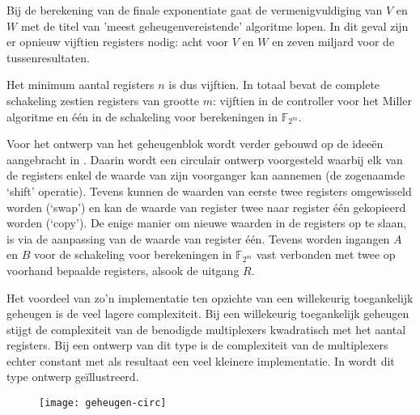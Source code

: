 Bij de berekening van de finale exponentiate gaat de vermenigvuldiging van $V$ en $W$ met de titel van 'meest geheugenvereistende' algoritme lopen. In dit geval zijn er opnieuw vijftien registers nodig: acht voor $V$ en $W$ en zeven miljard voor de tussenresultaten.

Het minimum aantal registers $n$ is dus vijftien. In totaal bevat de complete schakeling zestien registers van grootte $m$: vijftien in de controller voor het Miller algoritme en \'e\'en in de schakeling voor berekeningen in $\mathbb{F}_{2^m}$.

Voor het ontwerp van het geheugenblok wordt verder gebouwd op de idee\"en aangebracht in \cite{lee}. Daarin wordt een circulair ontwerp voorgesteld waarbij elk van de registers enkel de waarde van zijn voorganger kan aannemen (de zogenaamde `shift' operatie). Tevens kunnen de waarden van eerste twee registers omgewisseld worden (`swap') en kan de waarde van register twee naar register \'e\'en gekopieerd worden (`copy'). De enige manier om nieuwe waarden in de registers op te slaan, is via de aanpassing van de waarde van register \'e\'en. Tevens worden ingangen $A$ en $B$ voor de schakeling voor berekeningen in $\mathbb{F}_{2^m}$ vast verbonden met twee op voorhand bepaalde registers, alsook de uitgang $R$. 

Het voordeel van zo'n implementatie ten opzichte van een willekeurig toegankelijk geheugen is de veel lagere complexiteit. Bij een willekeurig toegankelijk geheugen stijgt de complexiteit van de benodigde multiplexers kwadratisch met het aantal registers. Bij een ontwerp van dit type is de complexiteit van de multiplexers echter constant met als resultaat een veel kleinere implementatie. In  wordt dit type ontwerp ge\"illustreerd.

\begin{figure}[h]
	\centering
		\texttt{[image: geheugen-circ]}
		\label{figuur-implementatie-miller-geheugen-circ}
\end{figure}


